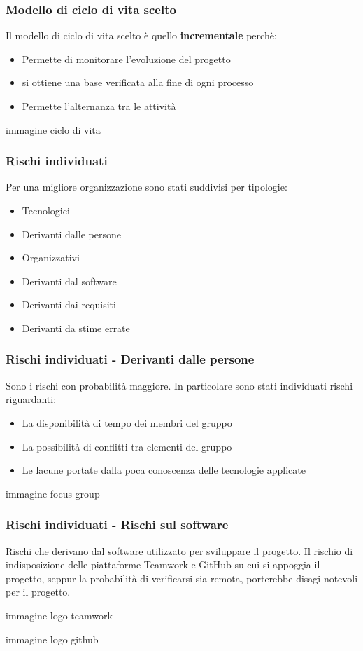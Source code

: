 \begin{frame}
  \frametitle{Modello di ciclo di vita scelto}
  Il modello di ciclo di vita scelto è quello \textbf{incrementale} perchè:
  \begin{itemize}
  \item Permette di monitorare l'evoluzione del progetto
  \item si ottiene una base verificata alla fine di ogni processo
  \item Permette l'alternanza tra le attività
  \end{itemize}

  immagine ciclo di vita
\end{frame}


\begin{frame}
  \frametitle{Rischi individuati}
  Per una migliore organizzazione sono stati suddivisi per tipologie:
  \begin{itemize}
  \item Tecnologici
  \item Derivanti dalle persone
  \item Organizzativi
  \item Derivanti dal software
  \item Derivanti dai requisiti
  \item Derivanti da stime errate
  \end{itemize}
\end{frame}
  
\begin{frame}
    \frametitle{Rischi individuati - Derivanti dalle persone}

    Sono i rischi con probabilità maggiore. In particolare sono stati individuati rischi riguardanti:
    \begin{itemize}
    \item La disponibilità di tempo dei membri del gruppo
    \item La possibilità di conflitti tra elementi del gruppo
    \item Le lacune portate dalla poca conoscenza delle tecnologie applicate
    \end{itemize}

    immagine focus group
\end{frame}

\begin{frame}
  \frametitle{Rischi individuati - Rischi sul software}
  Rischi che derivano dal software utilizzato per sviluppare il progetto.
  Il rischio di indisposizione delle piattaforme Teamwork e GitHub su cui si appoggia il progetto, seppur la probabilità di verificarsi sia remota, porterebbe disagi notevoli per il progetto.

  immagine logo teamwork

  immagine logo github
\end{frame}

